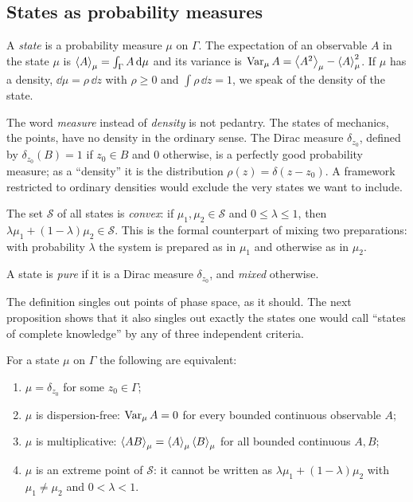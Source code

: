 \subsection{States as probability measures}

\begin{definition}[state]
A \emph{state} is a probability measure $\mu$ on $\Gamma$. The expectation of an observable $A$ in the state $\mu$ is $\left\langle A\right\rangle_\mu=\int_\Gamma A\,\mathrm{d}\mu$ and its variance is $\operatorname{Var}_\mu A=\left\langle A^2\right\rangle_\mu-\left\langle A\right\rangle_\mu^2$. If $\mu$ has a density, $\dd\mu=\rho\,\dd z$ with $\rho\ge0$ and $\int\rho\,\dd z=1$, we speak of the density of the state.
\end{definition}

The word \emph{measure} instead of \emph{density} is not pedantry. The states of mechanics, the points, have no density in the ordinary sense. The Dirac measure $\delta_{z_0}$, defined by $\delta_{z_0}(B)=1$ if $z_0\in B$ and $0$ otherwise, is a perfectly good probability measure; as a ``density'' it is the distribution $\rho(z)=\delta(z-z_0)$. A framework restricted to ordinary densities would exclude the very states we want to include.

The set $\mathcal S$ of all states is \emph{convex}: if $\mu_1,\mu_2\in\mathcal S$ and $0\le\lambda\le1$, then $\lambda\mu_1+(1-\lambda)\mu_2\in\mathcal S$. This is the formal counterpart of mixing two preparations: with probability $\lambda$ the system is prepared as in $\mu_1$ and otherwise as in $\mu_2$.

\begin{definition}
A state is \emph{pure} if it is a Dirac measure $\delta_{z_0}$, and \emph{mixed} otherwise.
\end{definition}

The definition singles out points of phase space, as it should. The next proposition shows that it also singles out exactly the states one would call ``states of complete knowledge'' by any of three independent criteria.

\begin{proposition}\label{prop:pure}
For a state $\mu$ on $\Gamma$ the following are equivalent:
\begin{enumerate}[label=(\alph*),nosep]
\item $\mu=\delta_{z_0}$ for some $z_0\in\Gamma$;
\item $\mu$ is dispersion-free: $\operatorname{Var}_\mu A=0$ for every bounded continuous observable $A$;
\item $\mu$ is multiplicative: $\left\langle AB\right\rangle_\mu=\left\langle A\right\rangle_\mu\left\langle B\right\rangle_\mu$ for all bounded continuous $A,B$;
\item $\mu$ is an extreme point of $\mathcal S$: it cannot be written as $\lambda\mu_1+(1-\lambda)\mu_2$ with $\mu_1\neq\mu_2$ and $0<\lambda<1$.
\end{enumerate}
\end{proposition}

